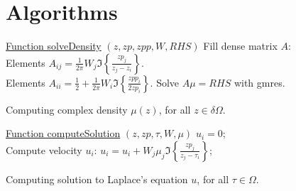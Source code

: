 \documentclass[a4paper,10pt]{article}
\begin{document}
\section{Algorithms}
\label{sec:alg}
\begin{algorithm}[ht]

    \underline{Function solveDensity} $(z,zp,zpp,W, RHS)$\;
    \Output{$\mu$}
     {
         {
            Fill dense matrix $A$: \\
                Elements $A_{ij} = \frac{1}{2\pi} W_j \Im\left\{ \frac{zp_j}{z_j - z_i} \right\}$. \\
                Elements $A_{ii} = \frac{1}{2} + \frac{1}{2\pi}W_i \Im\left\{ \frac{zpp_i}{2zp_i} \right\}$.
        }
    }
    Solve $A\mu=RHS$ with gmres.
    \caption{Computing complex density $\mu(z)$, for all $z\in\delta\Omega$.}
    \label{alg:solveDensity}
\end{algorithm}
\begin{algorithm}[ht]

    \underline{Function computeSolution} $(z,zp,\tau,W,\mu)$\;
     {
        $u_i = 0$; \\
         {
            Compute velocity $u_i$: 
            $u_i = u_i + W_j\mu_j\Im\left\{ \frac{zp_j}{z_j-\tau_i} \right\}$;
        }
    }
    \caption{Computing solution to Laplace's equation $u$, for all $\tau\in\Omega$.}
    \label{alg:compU}
\end{algorithm}
\end{document}
